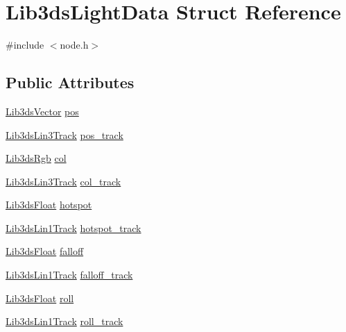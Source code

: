 \hypertarget{struct_lib3ds_light_data}{\section{Lib3ds\-Light\-Data Struct Reference}
\label{struct_lib3ds_light_data}
}


{\ttfamily \#include $<$node.\-h$>$}

\subsection*{Public Attributes}
\begin{DoxyCompactItemize}
\item 
\hyperlink{group__vector_ga6ac1c3b3ef15381ebf6baf264d658dcf}{Lib3ds\-Vector} \hyperlink{struct_lib3ds_light_data_aad544b9afb0bc37523216d76d4fdab80}{pos}
\item 
\hyperlink{struct_lib3ds_lin3_track}{Lib3ds\-Lin3\-Track} \hyperlink{struct_lib3ds_light_data_a69962a46cbafca2d3216c8fc98f4ffc4}{pos\-\_\-track}
\item 
\hyperlink{types_8h_a7e320d64d2488320001f7f3b25168ee3}{Lib3ds\-Rgb} \hyperlink{struct_lib3ds_light_data_a82752df09c03827a9e14ac4d443117ed}{col}
\item 
\hyperlink{struct_lib3ds_lin3_track}{Lib3ds\-Lin3\-Track} \hyperlink{struct_lib3ds_light_data_a6bdc5270b3fa4945a56923c064c9312f}{col\-\_\-track}
\item 
\hyperlink{types_8h_ab18e70f51f9a53c9dee8d930c8e1a7bf}{Lib3ds\-Float} \hyperlink{struct_lib3ds_light_data_a3834bb73f094bd6adbe8d2d97b033922}{hotspot}
\item 
\hyperlink{struct_lib3ds_lin1_track}{Lib3ds\-Lin1\-Track} \hyperlink{struct_lib3ds_light_data_a0677046830d568751af4d70c3a81aa83}{hotspot\-\_\-track}
\item 
\hyperlink{types_8h_ab18e70f51f9a53c9dee8d930c8e1a7bf}{Lib3ds\-Float} \hyperlink{struct_lib3ds_light_data_a319a2691acc75a8d9ee77dcf1269fa9f}{falloff}
\item 
\hyperlink{struct_lib3ds_lin1_track}{Lib3ds\-Lin1\-Track} \hyperlink{struct_lib3ds_light_data_aac8f3d42a94e6251a11b5942290f6a83}{falloff\-\_\-track}
\item 
\hyperlink{types_8h_ab18e70f51f9a53c9dee8d930c8e1a7bf}{Lib3ds\-Float} \hyperlink{struct_lib3ds_light_data_aab6fef9d8ac6fb70b962e39dbd7ea701}{roll}
\item 
\hyperlink{struct_lib3ds_lin1_track}{Lib3ds\-Lin1\-Track} \hyperlink{struct_lib3ds_light_data_ae1773687fe4ed47d73c2656b51c590be}{roll\-\_\-track}
\end{DoxyCompactItemize}


